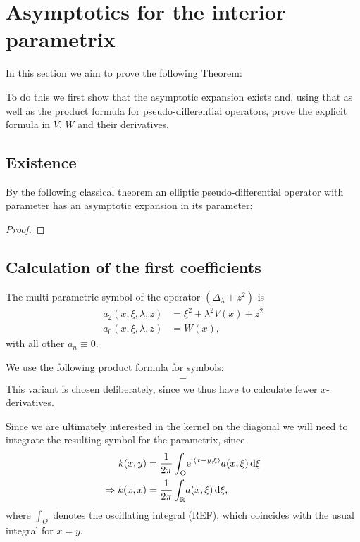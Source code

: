 \section{Asymptotics for the interior parametrix}
In this section we aim to prove the following Theorem:

To do this we first show that the asymptotic expansion exists and, using that as
well as the product formula for pseudo-differential operators, prove the
explicit formula in $V$, $W$ and their derivatives.
\subsection{Existence}
By the following classical theorem an elliptic pseudo-differential operator with
parameter has an asymptotic expansion in its parameter:

\begin{proof}
\end{proof}

\subsection{Calculation of the first coefficients}
The multi-parametric symbol of the operator $(\Delta_\lambda + z^2)$ is
\begin{align}
    a_2(x,\xi,\lambda,z) &= \xi^2 + \lambda^2 V(x) + z^2 \\
    a_0(x,\xi,\lambda,z) &= W(x),
    \label{eqn:symbol}
\end{align}
with all other $a_n \equiv 0$.

We use the following product formula for symbols:
\begin{align}
    =
    \label{eqn:product-formula}
\end{align}
This variant is chosen deliberately, since we thus have to calculate fewer
$x$-derivatives.

Since we are ultimately interested in the kernel on the diagonal we will need to
integrate the resulting symbol for the parametrix, since
\begin{align*}
    k(x,y) &= \frac{1}{2\pi}\int_{\mathrm{O}}^{}\!
        \mathrm e^{\mathrm i\left\langle x-y, \xi\right\rangle} a(x,\xi)
        \,\mathrm d{\xi} \\
    \Rightarrow k(x,x) &= \frac{1}{2\pi}\int_{\mathbb{R}}^{}\!a(x,\xi)\,\mathrm d{\xi},
\end{align*}
where $\int_{O}$ denotes the oscillating integral (REF), which coincides with
the usual integral for $x = y$.

